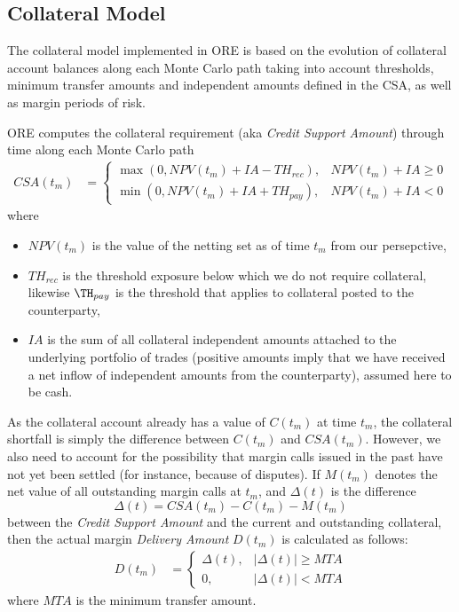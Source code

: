 \documentclass[12pt, a4paper]{article}
\newcommand{\NPV}{\mathit{NPV}}
\newcommand{\IA}{\mathit{IA}}
\newcommand{\Th}{\mathit{TH}}
\newcommand{\CSA}{\mathit{CSA}}
\begin{document}
{\begin{appendix}
\subsection{Collateral Model}\label{sec:app_collateral}

The collateral model implemented in ORE is based on the evolution of collateral account balances along each Monte Carlo
path taking into account thresholds, minimum transfer amounts and independent amounts defined in the CSA, as well as
margin periods of risk.

ORE computes the collateral requirement (aka \emph{Credit Support Amount}) through time along each Monte Carlo path
\begin{align}\label{eq:CSA}
CSA(t_m) &= 
\begin{cases}
\max(0, \NPV(t_m) + \IA - \Th_{rec}),& \NPV(t_m) + \IA \ge 0 \\
\min(0, \NPV(t_m) + \IA + \Th_{pay}),& \NPV(t_m) + \IA < 0
\end{cases}
\end{align}
where
\begin{itemize}
\item $\NPV(t_m)$ is the value of the netting set as of
  time $t_m$ from our persepctive,
  \item $\Th_{rec}$ is the threshold exposure below which we do not 
  require collateral, likewise $\TH_{pay}$ is the threshold that applies to collateral posted to the counterparty,
\item $\IA$ is the sum of all collateral independent amounts attached to
  the underlying portfolio of trades (positive amounts imply that we
  have received a net inflow of independent amounts from the
  counterparty), assumed here to be cash.
\end{itemize}

As the collateral account already has a value of $C(t_m)$ at time $t_m$, the collateral shortfall is simply the
difference between $C(t_m)$ and $\CSA(t_m)$. However, we also need to account for the possibility that margin calls
issued in the past have not yet been settled (for instance, because of disputes). If $M(t_m)$ denotes the net value of
all outstanding margin calls at $t_m$, and $\Delta(t)$ is the difference 
$$
\Delta(t) = \CSA(t_m) - C(t_m) - M(t_m)
$$
between the {\em Credit Support Amount} and the current and outstanding collateral, then the actual margin
\emph{Delivery Amount} $D(t_m)$ is calculated as follows:
\begin{align}\label{eq:DA}
D(t_m) &= 
\begin{cases}
\Delta(t),& \left| \Delta(t) \right| \ge MTA \\
0,& \left| \Delta(t) \right| < MTA
\end{cases}
\end{align}
where $MTA$ is the minimum transfer amount. 


\end{appendix}}
\end{document}

